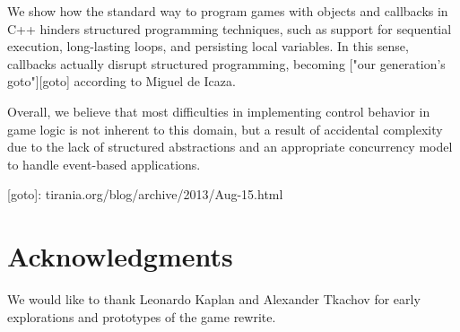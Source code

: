 \documentclass{vgtc}                          %
\begin{document}
We show how the standard way to program games with objects and callbacks in C++
hinders structured programming techniques, such as support for sequential
execution, long-lasting loops, and persisting local variables.
In this sense, callbacks actually disrupt structured programming, becoming
["our generation’s goto"][goto] according to Miguel de Icaza.

Overall, we believe that most difficulties in implementing control behavior in 
game logic is not inherent to this domain, but a result of accidental
complexity due to the lack of structured abstractions and an appropriate
concurrency model to handle event-based applications.

[goto]: tirania.org/blog/archive/2013/Aug-15.html

\section{Acknowledgments}

We would like to thank Leonardo Kaplan and Alexander Tkachov for early
explorations and prototypes of the game rewrite.



\end{document}
